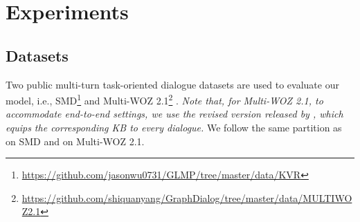 \documentclass[11pt]{article}
\begin{document}
\begin{table*}[htb]
\centering
{}
\caption{BLEU and Entity F1 comparison of COMET with other counterparts. The best results are in \textbf{bold font} and the second-best results are \underline{underlined}. 
The results on the SMD and Multi-WOZ 2.1 datasets are adopted from \cite{qin-etal-2020-dynamic} and \cite{yang-etal-2020-graphdialog}, respectively.
}
\label{tab:results}
\end{table*}


\section{Experiments}
\label{sec:experiments}


\subsection{Datasets}
\label{ssec:datasets}
Two public multi-turn task-oriented dialogue datasets are used to evaluate our model, i.e., SMD\footnote{\url{https://github.com/jasonwu0731/GLMP/tree/master/data/KVR}} \cite{eric-etal-2017-key} and Multi-WOZ 2.1\footnote{\url{https://github.com/shiquanyang/GraphDialog/tree/master/data/MULTIWOZ2.1}} \cite{budzianowski-etal-2018-multiwoz}. \textit{Note that, for Multi-WOZ 2.1, to accommodate end-to-end settings, we use the revised version released by \cite{yang-etal-2020-graphdialog}, which equips the corresponding KB to every dialogue.} We follow the same partition as \cite{madotto-etal-2018-mem2seq} on SMD and \cite{yang-etal-2020-graphdialog} on Multi-WOZ 2.1. 
\end{document}
